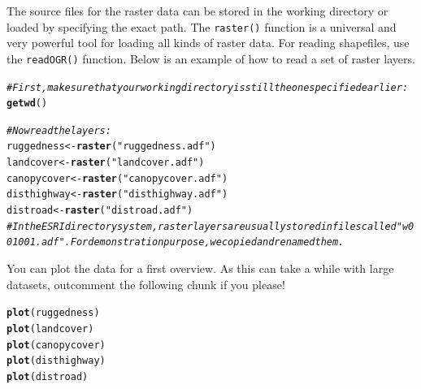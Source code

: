 \documentclass[11pt, a4paper]{article}\usepackage[]{graphicx}\usepackage[]{color}
\makeatletter
\newcommand{\hlstr}[1]{\textcolor[rgb]{0.192,0.494,0.8}{#1}}%
\newcommand{\hlcom}[1]{\textcolor[rgb]{0.678,0.584,0.686}{\textit{#1}}}%
\newcommand{\hlstd}[1]{\textcolor[rgb]{0.345,0.345,0.345}{#1}}%
\newcommand{\hlkwb}[1]{\textcolor[rgb]{0.69,0.353,0.396}{#1}}%
\newcommand{\hlkwd}[1]{\textcolor[rgb]{0.737,0.353,0.396}{\textbf{#1}}}%
\newenvironment{kframe}{%
 \def\at@end@of@kframe{}%
 \ifinner\ifhmode%
  \def\at@end@of@kframe{\end{minipage}}%
  \begin{minipage}{\columnwidth}%
 \fi\fi%
 \def\FrameCommand##1{\hskip\@totalleftmargin \hskip-\fboxsep
 \colorbox{shadecolor}{##1}\hskip-\fboxsep
     \hskip-\linewidth \hskip-\@totalleftmargin \hskip\columnwidth}%
 \MakeFramed {\advance\hsize-\width
   \@totalleftmargin\z@ \linewidth\hsize
   \@setminipage}}%
 {\par\unskip\endMakeFramed%
 \at@end@of@kframe}
\newenvironment{knitrout}{}{} %
\makeatother
\begin{document}
The source files for the raster data can be stored in the working directory or loaded by specifying the exact path. The \texttt{raster()} function is a universal and very powerful tool for loading all kinds of raster data. For reading shapefiles, use the \texttt{readOGR()} function. Below is an example of how to read a set of raster layers.
\begin{knitrout}
\color{fgcolor}\begin{kframe}
\begin{alltt}
\hlcom{# First, make sure that your working directory is still the one specified earlier:}
\hlkwd{getwd}\hlstd{()}

\hlcom{# Now read the layers:}
\hlstd{ruggedness} \hlkwb{<-} \hlkwd{raster}\hlstd{(}\hlstr{"ruggedness.adf"}\hlstd{)}
\hlstd{landcover} \hlkwb{<-} \hlkwd{raster}\hlstd{(}\hlstr{"landcover.adf"}\hlstd{)}
\hlstd{canopycover} \hlkwb{<-} \hlkwd{raster}\hlstd{(}\hlstr{"canopycover.adf"}\hlstd{)}
\hlstd{disthighway} \hlkwb{<-} \hlkwd{raster}\hlstd{(}\hlstr{"disthighway.adf"}\hlstd{)}
\hlstd{distroad} \hlkwb{<-} \hlkwd{raster}\hlstd{(}\hlstr{"distroad.adf"}\hlstd{)}
\hlcom{# In the ESRI directory system, raster layers are usually stored in files called "w001001.adf". For demonstration purpose, we copied and renamed them.}
\end{alltt}
\end{kframe}
\end{knitrout}

You can plot the data for a first overview. As this can take a while with large datasets, outcomment the following chunk if you please!
\begin{knitrout}
\color{fgcolor}\begin{kframe}
\begin{alltt}
\hlkwd{plot}\hlstd{(ruggedness)}
\hlkwd{plot}\hlstd{(landcover)}
\hlkwd{plot}\hlstd{(canopycover)}
\hlkwd{plot}\hlstd{(disthighway)}
\hlkwd{plot}\hlstd{(distroad)}
\end{alltt}
\end{kframe}
\end{knitrout}
\end{document}
